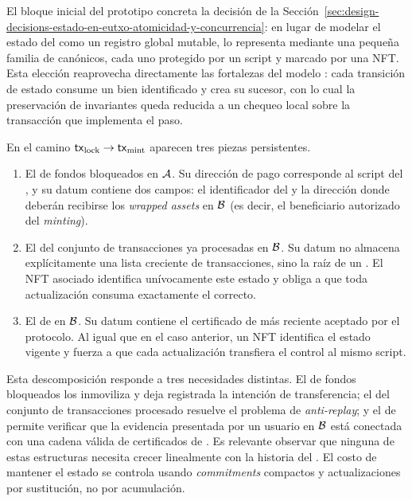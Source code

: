 El bloque inicial del prototipo concreta la decisión de la Sección~\ref{sec:design-decisions-estado-en-eutxo-atomicidad-y-concurrencia}: en lugar de modelar el estado del \zkBridge como un registro global mutable, lo representa mediante una pequeña familia de \UTxOs canónicos, cada uno protegido por un script y marcado por una NFT. Esta elección reaprovecha directamente las fortalezas del modelo \eUTxO \cite{Chakravarty2020}: cada transición de estado consume un \UTxO bien identificado y crea su sucesor, con lo cual la preservación de invariantes queda reducida a un chequeo local sobre la transacción que implementa el paso.

En el camino $\mathsf{tx}_{\mathrm{lock}} \rightarrow \mathsf{tx}_{\mathrm{mint}}$ aparecen tres piezas persistentes.

\begin{enumerate}[noitemsep]
  \item El \UTxO de fondos bloqueados en $\mathcal{A}$. Su dirección de pago corresponde al script del \UnlockingValidator, y su datum contiene dos campos: el identificador del \zkBridge y la dirección donde deberán recibirse los \textit{wrapped assets} en $\mathcal{B}$ (es decir, el beneficiario autorizado del \textit{minting}).
  \item El \UTxO del conjunto de transacciones ya procesadas en $\mathcal{B}$. Su datum no almacena explícitamente una lista creciente de transacciones, sino la raíz de un \SMT. El NFT asociado identifica unívocamente este estado y obliga a que toda actualización consuma exactamente el \UTxO correcto.
  \item El \UTxO de \StakeDistribution en $\mathcal{B}$. Su datum contiene el certificado de \Mithril más reciente aceptado por el protocolo. Al igual que en el caso anterior, un NFT identifica el estado vigente y fuerza a que cada actualización transfiera el control al mismo script.
\end{enumerate}

Esta descomposición responde a tres necesidades distintas. El \UTxO de fondos bloqueados los inmoviliza y deja registrada \Onchain la intención de transferencia; el \UTxO del conjunto de transacciones procesado resuelve el problema de \textit{anti-replay}; y el \UTxO de \StakeDistribution permite verificar que la evidencia presentada por un usuario en $\mathcal{B}$ está conectada con una cadena válida de certificados de \Mithril. Es relevante observar que ninguna de estas estructuras necesita crecer linealmente con la historia del \zkBridge. El costo de mantener el estado se controla usando \textit{commitments} compactos y actualizaciones por sustitución, no por acumulación.

